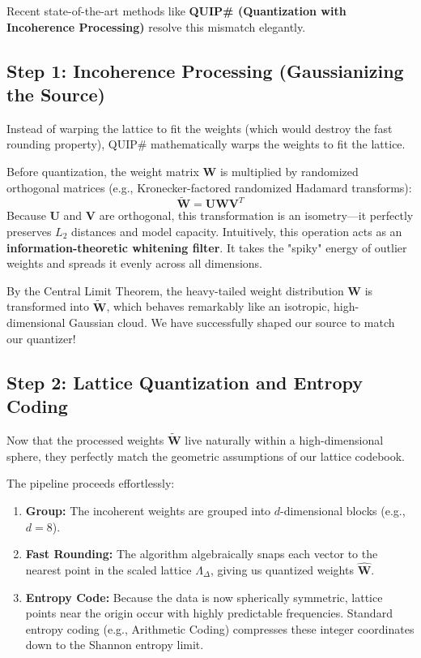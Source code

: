 \documentclass[11pt]{article}
\begin{document}
Recent state-of-the-art methods like \textbf{QUIP\# (Quantization with Incoherence Processing)} resolve this mismatch elegantly.

\subsection{Step 1: Incoherence Processing (Gaussianizing the Source)}
Instead of warping the lattice to fit the weights (which would destroy the fast rounding property), QUIP\# mathematically warps the weights to fit the lattice. 

Before quantization, the weight matrix $\mathbf{W}$ is multiplied by randomized orthogonal matrices (e.g., Kronecker-factored randomized Hadamard transforms):
\begin{equation}
    \widetilde{\mathbf{W}} = \mathbf{U} \mathbf{W} \mathbf{V}^T
\end{equation}
Because $\mathbf{U}$ and $\mathbf{V}$ are orthogonal, this transformation is an isometry---it perfectly preserves $L_2$ distances and model capacity. Intuitively, this operation acts as an \textbf{information-theoretic whitening filter}. It takes the "spiky" energy of outlier weights and spreads it evenly across all dimensions. 

By the Central Limit Theorem, the heavy-tailed weight distribution $\mathbf{W}$ is transformed into $\widetilde{\mathbf{W}}$, which behaves remarkably like an isotropic, high-dimensional Gaussian cloud. We have successfully shaped our source to match our quantizer!

\subsection{Step 2: Lattice Quantization and Entropy Coding}
Now that the processed weights $\widetilde{\mathbf{W}}$ live naturally within a high-dimensional sphere, they perfectly match the geometric assumptions of our lattice codebook. 

The pipeline proceeds effortlessly:
\begin{enumerate}
    \item \textbf{Group:} The incoherent weights are grouped into $d$-dimensional blocks (e.g., $d=8$).
    \item \textbf{Fast Rounding:} The algorithm algebraically snaps each vector to the nearest point in the scaled lattice $\Lambda_\Delta$, giving us quantized weights $\widehat{\mathbf{W}}$.
    \item \textbf{Entropy Code:} Because the data is now spherically symmetric, lattice points near the origin occur with highly predictable frequencies. Standard entropy coding (e.g., Arithmetic Coding) compresses these integer coordinates down to the Shannon entropy limit.
\end{enumerate}
\end{document}
